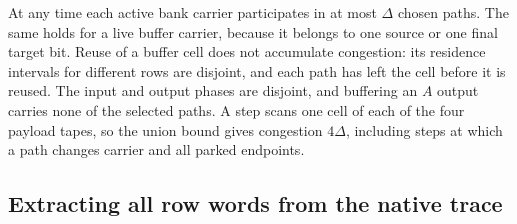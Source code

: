 \begin{informalproof}
At any time each active bank carrier participates in at most $\Delta$
chosen paths.  The same holds for a live buffer carrier, because it
belongs to one source or one final target bit.  Reuse of a buffer cell
does not accumulate congestion: its residence intervals for different
rows are disjoint, and each path has left the cell before it is reused.
The input and output phases are disjoint, and buffering an $A$ output
carries none of the selected paths.  A step scans one cell of each of the
four payload tapes, so the union bound gives congestion $4\Delta$,
including steps at which a path changes carrier and all parked endpoints.
\end{informalproof}

\subsection{Extracting all row words from the native trace}\label{sec:details-cd-row-words}

